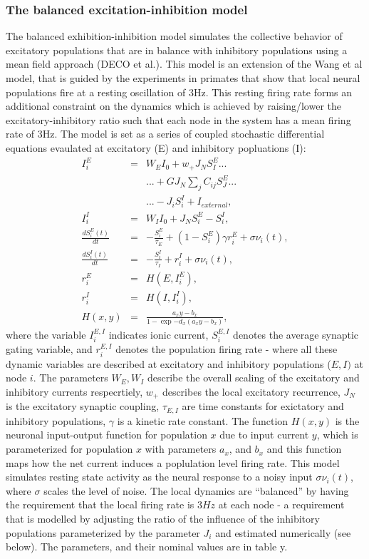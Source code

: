 \documentclass[oneside]{zHenriquesLab-StyleBioRxiv}
\begin{document}
\subsubsection*{The balanced excitation-inhibition model} 
The balanced exhibition-inhibition model simulates the collective behavior of excitatory populations that are in balance with inhibitory populations using a mean field approach (DECO et al.). This model is an extension of the Wang et al model, that is guided by the experiments in primates that show that local neural populations fire at a resting oscillation of 3Hz. This resting firing rate forms an additional constraint on the dynamics which is achieved by raising/lower the excitatory-inhibitory ratio such that each node in the system has a mean firing rate of 3Hz. 
The model is set as a series of coupled stochastic differential equations evaulated at excitatory (E) and inhibitory popluations (I):
\begin{eqnarray}
I_i^E &= &W_EI_0 + w_+J_{N}S_I^E ... \nonumber \\
& &... + GJ_{N}\sum_jC_{ij}S_J^E ... \nonumber \\ 
& &... - J_iS_i^I + I_{external}, \\
I_i^I &= &W_II_0 + J_{N}S_i^E - S_i^I, \\
\frac{dS_i^E(t)}{dt} &= &-\frac{S_i^E}{\tau_E} + (1 - S_i^E)\gamma r_i^E + \sigma \nu_i(t),\\
\frac{dS_i^I(t)}{dt} &= &-\frac{S_i^I}{\tau_I} + r_i^I + \sigma\nu_i(t),\\
r_i^E &= &H(E,I_i^E),\\
r_i^I &= &H(I,I_i^I),\\
H(x,y) &= &\frac{a_xy - b_x}{1 - \exp{-d_x(a_xy - b_x)}},
\end{eqnarray}
where the variable $I_i^{E,I}$ indicates ionic current, $S_i^{E,I}$ denotes the average synaptic gating variable, and $r_i^{E,I}$ denotes the population firing rate - where all these dynamic variables are described at excitatory and inhibitory populations ($E,I)$ at node $i$. The parameters $W_E,W_I$ describe the overall scaling of the excitatory and inhibitory currents respecrtiely, $w_{+}$ describes the local excitatory recurrence, $J_{N}$ is the excitatory synaptic coupling, $\tau_{E,I}$ are time constants for exictatory and inhibitory populations, $\gamma$ is a kinetic rate constant. The function $H(x,y)$ is the neuronal input-output function for population $x$ due to input current $y$, which is parameterized for population $x$ with parameters $a_{x}$, and $b_{x}$ and this function maps how the net current induces a poplulation level firing rate. This model simulates resting state activity as the neural response to a noisy input $\sigma \nu_i(t)$, where $\sigma$ scales the level of noise. The local dynamics are  ``balanced'' by having the requirement that the local firing rate is $3Hz$ at each node - a requirement that is modelled by adjusting the ratio of the influence of the inhibitory populations parameterized by the parameter $J_i$ and estimated numerically (see below). The parameters, and their nominal values are in table y. 
\end{document}
